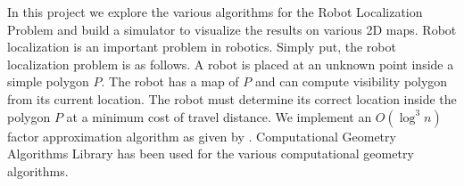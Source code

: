 


\begin{abstracts}        %

In this project we explore the various algorithms for the Robot Localization Problem and build a simulator to visualize the results on
various 2D maps.
Robot localization is an important problem in robotics. Simply put, the robot localization problem is as follows. A robot is 
placed at an unknown point inside a simple polygon $ P $. The robot has a map of 
$ P$ and can compute visibility polygon from its current location. The robot must determine its correct 
location inside the polygon $P $ at a minimum cost of travel distance. We implement an ${O(\log^3 n)} $ factor approximation algorithm 
as given by \cite{key1}. Computational Geometry Algorithms Library \cite{CGAL} has been used for the various computational geometry
 algorithms.



\end{abstracts}




